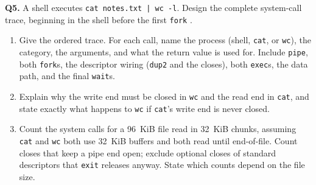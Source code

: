 \documentclass[11pt]{article}
\begin{document}
\textbf{Q5.} A shell executes \texttt{cat notes.txt | wc -l}. Design the complete system-call trace, beginning in the shell before the first \texttt{fork} \cite{SilberschatzOSC_operating_system_concepts}.
\begin{enumerate}
  \item[(a)] Give the ordered trace. For each call, name the process (shell, \texttt{cat}, or \texttt{wc}), the category, the arguments, and what the return value is used for. Include \texttt{pipe}, both \texttt{fork}s, the descriptor wiring (\texttt{dup2} and the closes), both \texttt{exec}s, the data path, and the final \texttt{wait}s.
  \item[(b)] Explain why the write end must be closed in \texttt{wc} and the read end in \texttt{cat}, and state exactly what happens to \texttt{wc} if \texttt{cat}'s write end is never closed.
  \item[(c)] Count the system calls for a 96~KiB file read in 32~KiB chunks, assuming \texttt{cat} and \texttt{wc} both use 32~KiB buffers and both read until end-of-file. Count closes that keep a pipe end open; exclude optional closes of standard descriptors that \texttt{exit} releases anyway. State which counts depend on the file size.
\end{enumerate}
\end{document}

